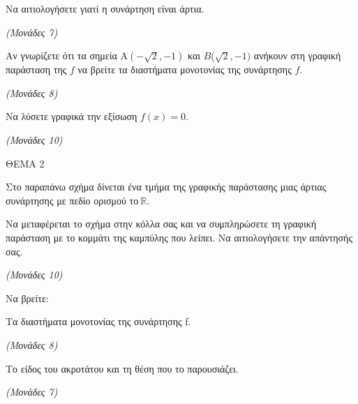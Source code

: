 \documentclass[11pt,a4paper,twoside]{book}
\newcommand{\monades}[1]{\hfill \textit{(Μονάδες #1)}}
\begin{document}
\begin{alist}
\item Να αιτιολογήσετε γιατί η συνάρτηση είναι άρτια.

\monades{7}

\item Αν γνωρίζετε ότι τα σημεία Α$\left( - \sqrt{2}, - 1 \right)$ και $Β$($\sqrt{2}, - 1)$ ανήκουν στη γραφική παράσταση της $f$ να βρείτε τα διαστήματα μονοτονίας της συνάρτησης $f$.

\monades{8}

\item Να λύσετε γραφικά την εξίσωση $f(x) = 0.$

\monades{10}
\end{alist}

\vspace{4mm}

ΘΕΜΑ 2

\begin{center}
\end{center}

Στο παραπάνω σχήμα δίνεται ένα τμήμα της γραφικής παράστασης μιας άρτιας συνάρτησης με πεδίο ορισμού το$\ \mathbb{R.}$

\begin{alist}
\item Να μεταφέρεται το σχήμα στην κόλλα σας και να συμπληρώσετε τη γραφική παράσταση με το κομμάτι της καμπύλης που λείπει. Να αιτιολογήσετε την απάντησής σας.

\monades{10}

\item Να βρείτε:
\begin{rlist}
\item Τα διαστήματα μονοτονίας της συνάρτησης f.

\monades{8}

\item Tο είδος του ακροτάτου και τη θέση που το παρουσιάζει.

\monades{7}
\end{rlist}
\end{alist}
\end{document}
